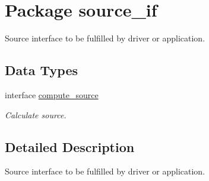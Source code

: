 \hypertarget{a00036}{
\section{Package source\_\-if}
\label{a00036}
}
Source interface to be fulfilled by driver or application.  


\subsection*{Data Types}
\begin{CompactItemize}
\item 
interface \hyperlink{a00001}{compute\_\-source}
\begin{CompactList}\small\item\em Calculate source. \item\end{CompactList}\end{CompactItemize}


\subsection{Detailed Description}
Source interface to be fulfilled by driver or application. 

